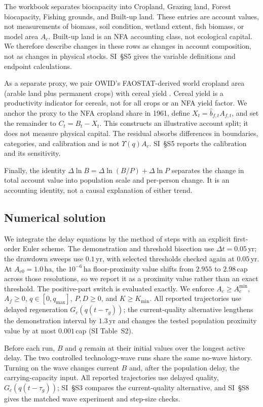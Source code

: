 \documentclass[preprint,12pt,authoryear]{elsarticle}
\newcommand{\Acmin}{A_c^{\min}}
\begin{document}
The workbook separates biocapacity into Cropland, Grazing land, Forest biocapacity, Fishing grounds, and Built-up land. These entries are account values, not measurements of biomass, soil condition, wetland extent, fish biomass, or model area $A_c$. Built-up land is an NFA accounting class, not ecological capital. We therefore describe changes in these rows as changes in account composition, not as changes in physical stocks. SI~\S S5 gives the variable definitions and endpoint calculations.

As a separate proxy, we pair OWID's FAOSTAT-derived world cropland area (arable land plus permanent crops) with cereal yield \citep{OWIDCereal2026,OWIDCropland2026}. Cereal yield is a productivity indicator for cereals, not for all crops or an NFA yield factor. We anchor the proxy to the NFA cropland share in 1961, define $X_t=\hat b_{f,t}A_{f,t}$, and set the remainder to $C_t=B_t-X_t$. This constructs an illustrative account split; it does not measure physical capital. The residual absorbs differences in boundaries, categories, and calibration and is not $\Upsilon(q)A_c$. SI~\S S5 reports the calibration and its sensitivity.

Finally, the identity $\Delta\ln B=\Delta\ln(B/P)+\Delta\ln P$ separates the change in total account value into population scale and per-person change. It is an accounting identity, not a causal explanation of either trend.

\subsection{Numerical solution}\label{sec:numerics}

We integrate the delay equations by the method of steps with an explicit first-order Euler scheme. The demonstration and threshold bisection use $\Delta t=0.05$\,yr; the drawdown sweeps use $0.1$\,yr, with selected thresholds checked again at $0.05$\,yr. At $A_{c0}=1.0$\,ha, the $10^{-6}$\,ha floor-proximity value shifts from $2.955$ to $2.98$\,cap across those resolutions, so we report it as a proximity value rather than an exact threshold. The positive-part switch is evaluated exactly. We enforce $A_c\ge\Acmin$, $A_f\ge0$, $q\in[0,q_{\max}]$, $P,D\ge0$, and $K\ge K_{\min}$. All reported trajectories use delayed regeneration $G_c(q(t-\tau_g))$; the current-quality alternative lengthens the demonstration interval by $1.3$\,yr and changes the tested population proximity value by at most $0.001$\,cap (SI Table~S2).

Before each run, $B$ and $q$ remain at their initial values over the longest active delay. The two controlled technology-wave runs share the same no-wave history. Turning on the wave changes current $B$ and, after the population delay, the carrying-capacity input. All reported trajectories use delayed quality, $G_c(q(t-\tau_g))$; SI~\S S3 compares the current-quality alternative, and SI~\S S8 gives the matched wave experiment and step-size checks.
\end{document}
